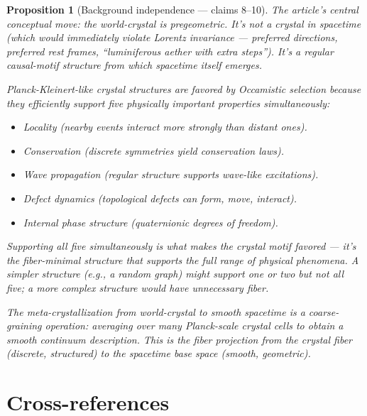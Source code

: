 \documentclass[11pt,a4paper]{article}
\newtheorem{proposition}[definition]{Proposition}
\begin{document}
\begin{proposition}[Background independence --- claims 8--10]
\label{prop:crystal}
The article's central conceptual move: the world-crystal is
\emph{pregeometric}. It's not a crystal in spacetime (which would
immediately violate Lorentz invariance --- preferred directions,
preferred rest frames, ``luminiferous aether with extra steps'').
It's a regular causal-motif structure from which spacetime itself
emerges.

Planck-Kleinert-like crystal structures are favored by Occamistic
selection because they efficiently support five physically important
properties simultaneously:
\begin{itemize}
\item Locality (nearby events interact more strongly than distant ones).
\item Conservation (discrete symmetries yield conservation laws).
\item Wave propagation (regular structure supports wave-like excitations).
\item Defect dynamics (topological defects can form, move, interact).
\item Internal phase structure (quaternionic degrees of freedom).
\end{itemize}

Supporting all five simultaneously is what makes the crystal motif
favored --- it's the fiber-minimal structure that supports the full
range of physical phenomena. A simpler structure (e.g., a random
graph) might support one or two but not all five; a more complex
structure would have unnecessary fiber.

The meta-crystallization from world-crystal to smooth spacetime
is a coarse-graining operation: averaging over many Planck-scale
crystal cells to obtain a smooth continuum description. This is
the fiber projection from the crystal fiber (discrete, structured)
to the spacetime base space (smooth, geometric).
\end{proposition}


\section{Cross-references}
\end{document}
